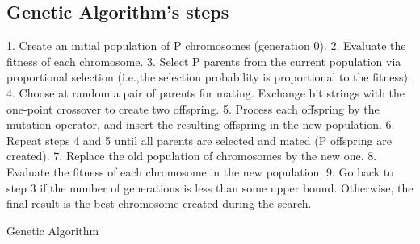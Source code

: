 \begin{algorithm}
       \section{Genetic Algorithm's steps}   
          1. Create an initial population of P chromosomes (generation 0).
          2. Evaluate the fitness of each chromosome.
          3. Select P parents from the current population via proportional selection (i.e.,the selection probability is proportional to the fitness).
          4. Choose at random a pair of parents for mating. Exchange bit strings with the one-point crossover to create two offspring. 
          5. Process each offspring by the mutation operator, and insert the resulting offspring in the new population.
          6. Repeat steps 4 and 5 until all parents are selected and mated (P offspring are created). 
          7. Replace the old population of chromosomes by the new one.
          8. Evaluate the fitness of each chromosome in the new population.
          9. Go back to step 3 if the number of generations is less than some upper bound. Otherwise, the final result is the best chromosome created during the search. 

       
        \caption{Genetic Algorithm \TSP}
        \label{algo:genetic}


    \end{algorithm}
